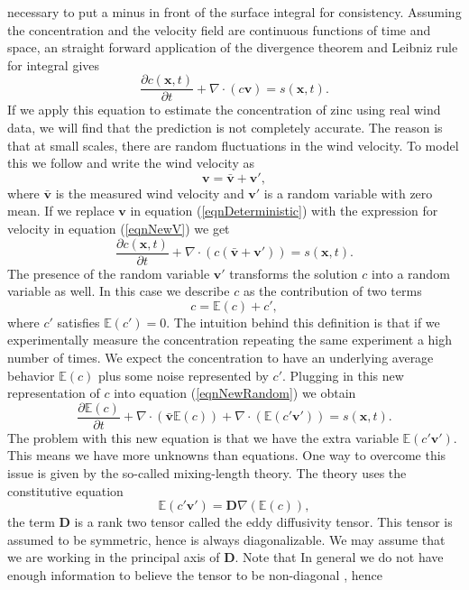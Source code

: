 \documentclass[12pt]{book}
\newcommand{\E}{\mathbb{E}} %
\newcommand{\x}{\textbf{x}}
\newcommand{\vv}{\textbf{v}}
\newcommand{\dv}{\nabla\cdot}
\begin{document}
necessary to put a minus in front of the surface integral for consistency. Assuming
the concentration and the velocity field are continuous functions of time and space, an 
straight forward application of the divergence theorem and Leibniz rule for integral gives
\begin{equation}\label{eqnDeterministic}
\frac{\partial c(\x,t)}{\partial t}+\nabla\cdot(c\textbf{v})=s(\x,t).
\end{equation}
If we apply this equation to estimate the concentration of zinc using real wind data, we 
will find that the prediction is not completely accurate. The reason is that at small scales, there
are random fluctuations in the wind velocity. To model this we follow \cite{seinfeld1998atmospheric}
and write the wind velocity as
\begin{equation}\label{eqnNewV}
\vv=\bar{\vv}+\vv',
\end{equation}
where $\bar{\vv}$ is the measured wind velocity and $\vv'$ is a random variable with zero mean.
If we replace $\vv$ in equation (\ref{eqnDeterministic}) with the expression for velocity
in equation (\ref{eqnNewV}) we get
\begin{equation}\label{eqnNewRandom}
\frac{\partial c(\x,t)}{\partial t}+\nabla\cdot(c(\bar{\textbf{v}}+\vv'))=s(\x,t).
\end{equation}
The presence of the random variable $\vv'$ transforms the solution $c$ into a random 
variable as well. In this case we describe $c$ as the contribution of two terms
\begin{equation*}
c=\E(c)+c',
\end{equation*}
where $c'$ satisfies $\E(c')=0$. The intuition behind this definition is that if we experimentally
measure the concentration repeating the same experiment a high number of times. We expect the 
concentration to have an underlying average behavior $\E(c)$ plus some  noise represented by $c'$.
Plugging in this new representation of $c$ into equation (\ref{eqnNewRandom}) we obtain
\begin{equation}\label{eqnInconsistent}
\frac{\partial\E(c)}{\partial t}+\dv(\bar{\vv}\E(c))+\dv(\E(c'\vv'))=s(\x,t).
\end{equation}
The problem with this new equation is that we have the extra variable $\E(c'\vv')$.
This means we have  more unknowns than equations. 
One way to overcome this issue is given by the so-called mixing-length theory. The
theory uses the constitutive equation
\begin{equation*}
\E(c'\vv')=\textbf{D}\nabla(\E(c)),
\end{equation*}
the term $\textbf{D}$ is  a rank two tensor called the eddy diffusivity tensor. This tensor is assumed 
to be symmetric, hence is always diagonalizable. We may assume that we are working
in the principal axis of $\textbf{D}$. Note that  In general we do not have enough information to believe the tensor
to be non-diagonal \cite{seinfeld1998atmospheric}, hence 
\end{document}
